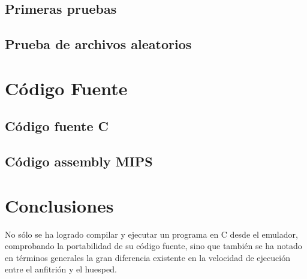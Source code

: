 \documentclass{article}
\begin{document}
\subsection{Primeras pruebas}

\subsection{Prueba de archivos aleatorios}


\section{C\'odigo Fuente}
\subsection{C\'odigo fuente C}

\subsection{C\'odigo assembly MIPS}


\section{Conclusiones}
No s\'olo se ha logrado compilar y ejecutar un programa en C desde el emulador, comprobando la portabilidad de su c\'odigo fuente, sino que tambi\'en se ha notado en t\'erminos generales la gran diferencia existente en la velocidad de ejecuci\'on entre el anfitri\'on y el huesped.
\end{document}
